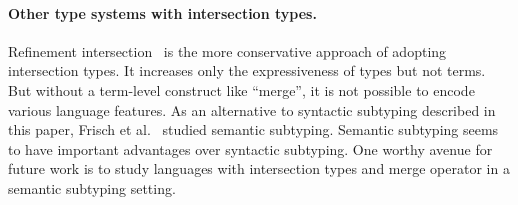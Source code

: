 \paragraph{Other type systems with intersection types.}
Refinement
intersection~\cite{dunfield2007refined,davies2005practical,freeman1991refinement}
is the more conservative approach of adopting intersection types. It increases
only the expressiveness of types but not terms. But without a term-level
construct like ``merge'', it is not possible to encode various language
features. As an alternative to syntactic subtyping described in this paper,
Frisch et al.~\cite{frisch2008semantic} studied semantic subtyping. Semantic
subtyping seems to have important advantages over syntactic subtyping. One
worthy avenue for future work is to study languages with intersection types
and merge operator in a semantic subtyping setting.

